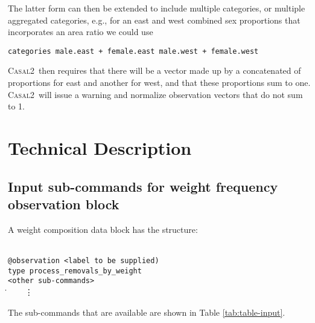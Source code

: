 \documentclass[a4paper,11pt,twoside,pdftex,draft]{article}
\newcommand{\CNAME}{\textsc{Casal2}}
\begin{document}
The latter form can then be extended to include multiple categories, or multiple aggregated categories, e.g., for an east and west combined sex proportions that incorporates an area ratio we could use

\texttt{categories male.east + female.east   male.west + female.west}

\CNAME~then requires that there will be a vector made up by a concatenated of proportions for east and another for west, and that these proportions sum to one. \CNAME~will issue a warning and normalize observation vectors that do not sum to 1.

\section{Technical Description}

\subsection{Input sub-commands for weight frequency observation block}

A weight composition data block has the structure:

\texttt{\\
@observation <label to be supplied)\\
type process\_removals\_by\_weight\\
<other sub-commands>\\
}
\.~~~~\vdots


The sub-commands that are available are shown in Table \ref{tab:table-input}.
\end{document}
